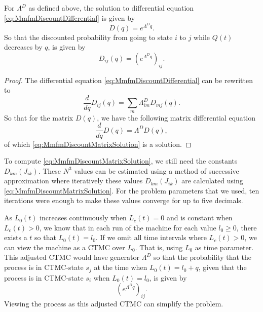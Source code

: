 \begin{theorem}
	For $\Lambda^D$ as defined above, the solution to differential equation \eqref{eq:MmfmDiscountDifferential} is given by
	\begin{equation}\label{eq:MmfmDiscountMatrixSolution}
	D(q)=e^{\Lambda^D q}.
	\end{equation}
	So that the discounted probability from going to state $i$ to $j$ while $Q(t)$ decreases by $q$, is given by
	\begin{equation}
	D_{ij}(q)=\left(e^{\Lambda^D q}\right)_{ij}.
	\end{equation}
	\begin{proof}
		The differential equation \eqref{eq:MmfmDiscountDifferential} can be rewritten to
		\[
			\frac{d}{dq}D_{ij}(q)=\sum\limits_m\Lambda^D_{im}D_{mj}(q).
		\]
		So that for the matrix $D(q)$, we have the following matrix differential equation
		\[
		\frac{d}{dq}D(q)=\Lambda^D D(q),
		\]
		of which \eqref{eq:MmfmDiscountMatrixSolution} is a solution.
	\end{proof}
\end{theorem}

\begin{remark}
	To compute \eqref{eq:MmfmDiscountMatrixSolution}, we still need the constants $D_{km}(J_{ik})$.
	These $N^3$ values can be estimated using a method of successive approximation where iteratively these values $D_{km}(J_{ik})$ are calculated using \eqref{eq:MmfmDiscountMatrixSolution}.
	For the problem parameters that we used, ten iterations were enough to make these values converge for up to five decimals.
\end{remark}

\begin{remark}\label{remark:MmfmStochasticShortestPath}
	As $L_0(t)$ increases continuously when $L_c(t)=0$ and is constant when $L_c(t)>0$, we know that in each run of the machine for each value $l_0\geq0$, there exists a $t$ so that $L_0(t)=l_0$.
	If we omit all time intervals where $L_c(t)>0$, we can view the machine as a CTMC over $L_0$.
	That is, using $L_0$ as time parameter.
	This adjusted CTMC would have generator $\Lambda^D$ so that the probability that the process is in CTMC-state $s_j$ at the time when $L_0(t)=l_0+q$, given that the process is in CTMC-state $s_i$ when $L_0(t)=l_0$, is given by
	\[
	\left(e^{\Lambda^Dq}\right)_{ij}.
	\]
	Viewing the process as this adjusted CTMC can simplify the problem.
\end{remark}


